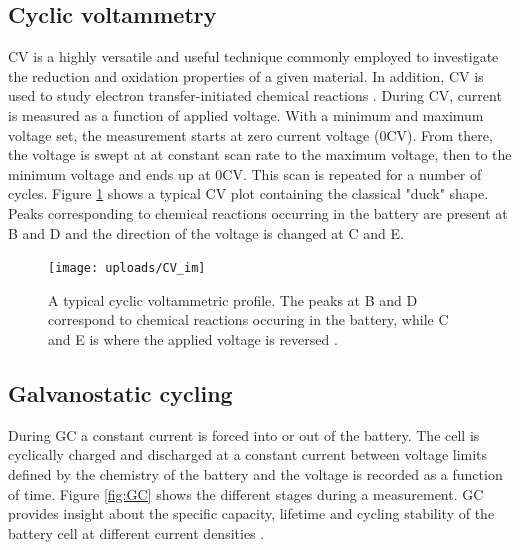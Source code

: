 \documentclass[Main/main.tex]{subfiles}
\begin{document}

\subsection{Cyclic voltammetry}
CV is a highly versatile and useful technique commonly employed to investigate the reduction and oxidation properties of a given material. In addition, CV is used to study electron transfer-initiated chemical reactions \cite{2_CV}. During CV, current is measured as a function of applied voltage. With a minimum and maximum voltage set, the measurement starts at zero current voltage (0CV). From there, the voltage is swept at at constant scan rate to the maximum voltage, then to the minimum voltage and ends up at 0CV. This scan is repeated for a number of cycles. Figure \ref{fig:CV} shows a typical CV plot containing the classical "duck" shape. Peaks corresponding to chemical reactions occurring in the battery are present at B and D and the direction of the voltage is changed at C and E.

\begin{figure}[ht]
    \centering
    \texttt{[image: uploads/CV\_im]}
    \caption{A typical cyclic voltammetric profile. The peaks at B and D correspond to chemical reactions occuring in the battery, while C and E is where the applied voltage is reversed \cite{CV_im}.}
    \label{fig:CV}
\end{figure}

\FloatBarrier
\subsection{Galvanostatic cycling}
During GC a constant current is forced into or out of the battery. The cell is cyclically charged and discharged at a constant current between voltage limits defined by the chemistry of the battery and the voltage is recorded as a function of time. Figure \ref{fig:GC} shows the different stages during a measurement.
GC provides insight about the specific capacity, lifetime and cycling stability of the battery cell at different current densities \cite{kvamme}.
\end{document}
